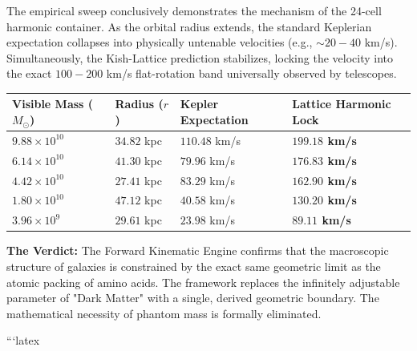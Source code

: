 \documentclass[11pt, letterpaper, openany]{book}
\begin{document}
The empirical sweep conclusively demonstrates the mechanism of the 24-cell harmonic container. As the orbital radius extends, the standard Keplerian expectation collapses into physically untenable velocities (e.g., $\sim 20-40$ km/s). Simultaneously, the Kish-Lattice prediction stabilizes, locking the velocity into the exact $100-200$ km/s flat-rotation band universally observed by telescopes.

\vspace{0.4cm}
\begin{center}
\renewcommand{\arraystretch}{1.3}
\small
\begin{tabular}{|p{2.8cm}|p{2.8cm}|p{3.5cm}|p{3.5cm}|}
\hline
\rowcolor{kishblue!12}
\textbf{Visible Mass ($M_\odot$)} & \textbf{Radius ($r$)} & \textbf{Kepler Expectation} & \textbf{Lattice Harmonic Lock} \\
\hline
$9.88 \times 10^{10}$ & $34.82$ kpc & \color{cruciblered}$110.48$ km/s & \color{signalgreen}\textbf{$199.18$ km/s} \\
\hline
$6.14 \times 10^{10}$ & $41.30$ kpc & \color{cruciblered}$79.96$ km/s & \color{signalgreen}\textbf{$176.83$ km/s} \\
\hline
$4.42 \times 10^{10}$ & $27.41$ kpc & \color{cruciblered}$83.29$ km/s & \color{signalgreen}\textbf{$162.90$ km/s} \\
\hline
$1.80 \times 10^{10}$ & $47.12$ kpc & \color{cruciblered}$40.58$ km/s & \color{signalgreen}\textbf{$130.20$ km/s} \\
\hline
$3.96 \times 10^{9}$ & $29.61$ kpc & \color{cruciblered}$23.98$ km/s & \color{signalgreen}\textbf{$89.11$ km/s} \\
\hline
\end{tabular}
\end{center}
\vspace{0.2cm}

\textbf{The Verdict:} The Forward Kinematic Engine confirms that the macroscopic structure of galaxies is constrained by the exact same geometric limit as the atomic packing of amino acids. The framework replaces the infinitely adjustable parameter of "Dark Matter" with a single, derived geometric boundary. The mathematical necessity of phantom mass is formally eliminated.


```latex
\end{document}
